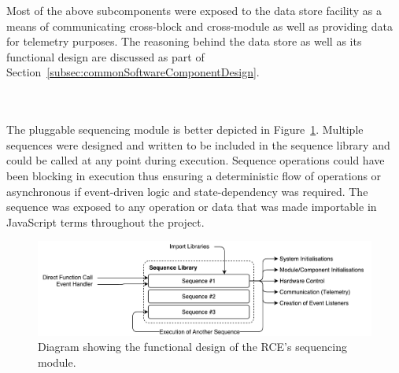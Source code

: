         Most of the above subcomponents were exposed to the data store facility as a means of communicating cross-block and cross-module as well as providing data for telemetry purposes. The reasoning behind the data store as well as its functional design are discussed as part of Section~\ref{subsec:commonSoftwareComponentDesign}.
        
        \\\\
          The pluggable sequencing module is better depicted in Figure~\ref{fig:softDesign-rceSystemSequencingDesign}. Multiple sequences were designed and written to be included in the sequence library and could be called at any point during execution. Sequence operations could have been blocking in execution thus ensuring a deterministic flow of operations or asynchronous if event-driven logic and state-dependency was required. The sequence was exposed to any operation or data that was made importable in JavaScript terms throughout the project.
          
          \begin{figure}[h!]
            \centering
            \includegraphics[width=0.9\linewidth]{figures/softDesign-rceSystemSequencingDesign}
            \caption[Diagram showing the functional design of the RCE's sequencing module.]{Diagram showing the functional design of the RCE's sequencing module.}
            \label{fig:softDesign-rceSystemSequencingDesign}
          \end{figure}
          
